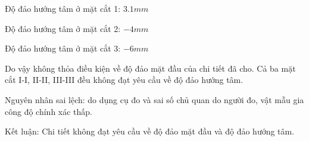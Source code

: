 Độ đảo hướng tâm ở mặt cắt 1: $ 3.1\unit{mm} $

Độ đảo hướng tâm ở mặt cắt 2: $ -4\unit{mm} $

Độ đảo hướng tâm ở mặt cắt 3: $ -6\unit{mm} $

Do vậy không thỏa điều kiện về độ đảo mặt đầu của chi tiết đã cho. Cả ba mặt cắt I-I, II-II, III-III đều không đạt yêu cầu về độ đảo hướng tâm.

Nguyên nhân sai lệch: do dụng cụ đo và sai số chủ quan do người đo, vật mẫu gia công độ chính xác thấp.

Kết luận: Chi tiết  không đạt yêu cầu về  độ đảo mặt đầu và độ đảo hướng tâm.